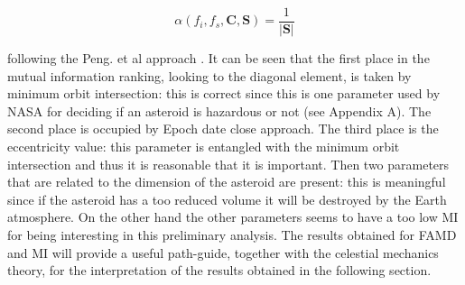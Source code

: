 \documentclass[12pt,%
               a4paper,%
               oneside,openany,%
               titlepage,%
               headinclude,footinclude,%
               BCOR5mm,%
               cleardoublepage=empty,%
               tablecaptionabove,%
               floatperchapter,
               ]{scrreprt}                 %
\begin{document}
\begin{equation}
\alpha(f_{i},f_{s},\textbf{C},\textbf{S})=\dfrac{1}{|\textbf{S}|}
\end{equation}

following the Peng. et al approach \cite{peng2005feature}. It can be seen that the first place in the mutual information ranking, looking to the diagonal element, is taken by minimum orbit intersection: this is correct since this is one parameter used by NASA for deciding if an asteroid is hazardous or not (see Appendix A). The second place is occupied by Epoch date close approach. The third place is the eccentricity value: this parameter is entangled with the minimum orbit intersection and thus it is reasonable that it is important. Then two parameters that are related to the dimension of the asteroid are present: this is meaningful since if the asteroid has a too reduced volume it will be destroyed by the Earth atmosphere. On the other hand the other parameters seems to have a too low MI for being interesting in this preliminary analysis. The results obtained for FAMD and MI will provide a useful path-guide, together with the celestial mechanics theory, for the interpretation of the results obtained in the following section. 
\end{document}
